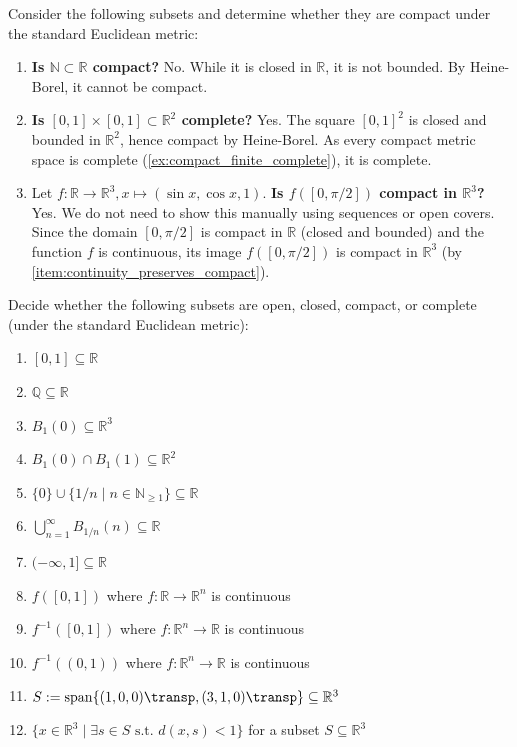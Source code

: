 \begin{example}
\label{ex:compactness_heine_borel_examples}
Consider the following subsets and determine whether they are compact under the standard Euclidean metric:
\begin{enumerate}[label=\textbf{(\alph*)}]
  \item \textbf{Is $\mathbb{N} \subset \mathbb{R}$ compact?} No. While it is closed in $\mathbb{R}$, it is not bounded. By Heine-Borel, it cannot be compact.
  \item \textbf{Is $[0,1] \times [0,1] \subset \mathbb{R}^2$ complete?} Yes. The square $[0,1]^2$ is closed and bounded in $\mathbb{R}^2$, hence compact by Heine-Borel. As every compact metric space is complete (\cref{ex:compact_finite_complete}), it is complete.
  \item Let $f: \mathbb{R} \to \mathbb{R}^3, x \mapsto (\sin x, \cos x, 1)$. \textbf{Is $f([0,\pi/2])$ compact in $\mathbb{R}^3$?} Yes. We do not need to show this manually using sequences or open covers. Since the domain $[0,\pi/2]$ is compact in $\mathbb{R}$ (closed and bounded) and the function $f$ is continuous, its image $f([0,\pi/2])$ is compact in $\mathbb{R}^3$ (by \cref{item:continuity_preserves_compact}).
\end{enumerate}
\end{example}

\begin{exercise}
\label{ex:topological_properties_table}
Decide whether the following subsets are open, closed, compact, or complete (under the standard Euclidean metric):
\begin{enumerate}[label=\textbf{(\alph*)}]
  \item $[0,1] \subseteq \mathbb{R}$
  \item $\mathbb{Q} \subseteq \mathbb{R}$
  \item $B_1(0) \subseteq \mathbb{R}^3$
  \item $B_1(0) \cap B_1(1) \subseteq \mathbb{R}^2$
  \item $\{0\} \cup \{1/n \mid n \in \mathbb{N}_{\ge 1}\} \subseteq \mathbb{R}$
  \item $\bigcup_{n=1}^\infty B_{1/n}(n) \subseteq \mathbb{R}$
  \item $(-\infty, 1] \subseteq \mathbb{R}$
  \item $f([0,1])$ where $f : \mathbb{R} \to \mathbb{R}^n$ is continuous
  \item $f^{-1}([0,1])$ where $f : \mathbb{R}^n \to \mathbb{R}$ is continuous
  \item $f^{-1}((0,1))$ where $f : \mathbb{R}^n \to \mathbb{R}$ is continuous
  \item $S := \operatorname{span}\{(1,0,0)\transp, (3,1,0)\transp\} \subseteq \mathbb{R}^3$
  \item $\{x \in \mathbb{R}^3 \mid \exists s \in S \text{ s.t.\ } d(x, s) < 1\}$ for a subset $S \subseteq \mathbb{R}^3$
\end{enumerate}
\end{exercise}

